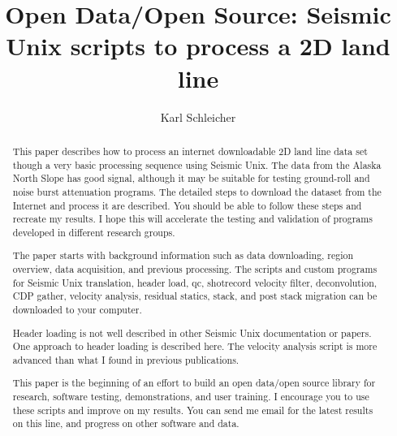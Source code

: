 
\title{Open Data/Open Source: Seismic Unix scripts to process a 2D land line}               %
\author{Karl Schleicher}

\address{
k\_schleicher@hotmail.com \\
John A. and Katherine G. Jackson School of Geosciences \\
The University of Texas at Austin \\
University Station, Box X \\
Austin, TX 78713-8924}

\maketitle

\begin{abstract}
This paper describes how to process an internet downloadable 2D land 
line data set though a very basic processing sequence using Seismic 
Unix. The data from the Alaska North Slope has good signal, 
although it may be suitable for testing ground-roll and noise burst 
attenuation programs.  The detailed steps to download the dataset from 
the Internet and process it are described.  You should be able to 
follow these steps and recreate my results.  I hope this will 
accelerate the testing and validation of programs developed in different
research groups.
\par
The paper starts with background information such as data downloading,
region overview, data acquisition, and previous processing.  The
scripts and custom programs for Seismic Unix translation, header load, 
qc, shotrecord velocity filter, deconvolution, CDP gather, velocity 
analysis, residual statics, stack, and post stack migration can be 
downloaded to your computer.

Header loading is not well described in other Seismic Unix documentation
or papers.  One approach to header loading is described here.  The velocity
analysis script is more advanced than what I found in previous publications.

This paper is the beginning of an effort to build an open data/open source 
library for research, software testing, demonstrations, and user training.  
I encourage you to use these scripts and improve on my results.  You can send 
me email for the latest results on this line, and progress on other software 
and data.
\end{abstract}

